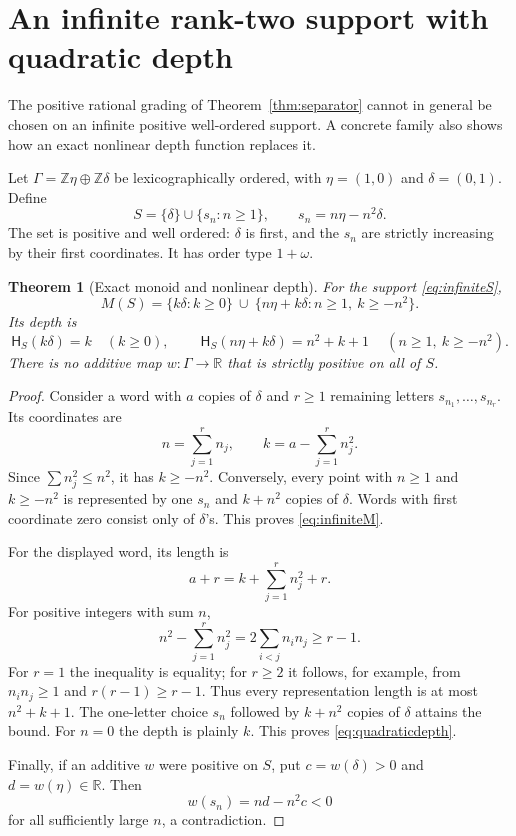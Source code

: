 \documentclass[11pt,a4paper]{article}
\newtheorem{theorem}{Theorem}[section]
\theoremstyle{definition}
\theoremstyle{remark}
\newcommand{\Z}{\mathbb Z}
\newcommand{\R}{\mathbb R}
\newcommand{\depth}{\mathsf H}
\begin{document}
\section{An infinite rank-two support with quadratic depth}
\label{sec:infinite}

The positive rational grading of Theorem~\ref{thm:separator} cannot in
general be chosen on an infinite positive well-ordered support. A concrete
family also shows how an exact nonlinear depth function replaces it.

Let $\Gamma=\Z\eta\oplus\Z\delta$ be lexicographically ordered, with
$\eta=(1,0)$ and $\delta=(0,1)$. Define
\begin{equation}\label{eq:infiniteS}
 S=\{\delta\}\cup\{s_n:n\ge1\},\qquad
 s_n=n\eta-n^2\delta.
\end{equation}
The set is positive and well ordered: $\delta$ is first, and the $s_n$ are
strictly increasing by their first coordinates. It has order type
$1+\omega$.

\begin{theorem}[Exact monoid and nonlinear depth]\label{thm:quadraticdepth}
For the support \eqref{eq:infiniteS},
\begin{equation}\label{eq:infiniteM}
 M(S)=\{k\delta:k\ge0\}
 \ \cup\ \{n\eta+k\delta:n\ge1,\ k\ge-n^2\}.
\end{equation}
Its depth is
\begin{equation}\label{eq:quadraticdepth}
 \depth_S(k\delta)=k\quad(k\ge0),\qquad
 \boxed{\ \depth_S(n\eta+k\delta)=n^2+k+1\ }
 \quad(n\ge1,\ k\ge-n^2).
\end{equation}
There is no additive map $w:\Gamma\to\R$ that is strictly positive on
all of $S$.
\end{theorem}
\begin{proof}
Consider a word with $a$ copies of $\delta$ and $r\ge1$ remaining letters
$s_{n_1},\ldots,s_{n_r}$. Its coordinates are
\[
 n=\sum_{j=1}^r n_j,\qquad
 k=a-\sum_{j=1}^r n_j^2.
\]
Since $\sum n_j^2\le n^2$, it has $k\ge-n^2$. Conversely, every point
with $n\ge1$ and $k\ge-n^2$ is represented by one $s_n$ and $k+n^2$
copies of $\delta$. Words with first coordinate zero consist only of
$\delta$'s. This proves \eqref{eq:infiniteM}.

For the displayed word, its length is
\[
 a+r=k+\sum_{j=1}^r n_j^2+r.
\]
For positive integers with sum $n$,
\[
 n^2-\sum_{j=1}^r n_j^2
 =2\sum_{i<j}n_in_j\ge r-1.
\]
For $r=1$ the inequality is equality; for $r\ge2$ it follows, for example,
from $n_in_j\ge1$ and $r(r-1)\ge r-1$.
Thus every representation length is at most $n^2+k+1$. The one-letter
choice $s_n$ followed by $k+n^2$ copies of $\delta$ attains the bound.
For $n=0$ the depth is plainly $k$. This proves \eqref{eq:quadraticdepth}.

Finally, if an additive $w$ were positive on $S$, put
$c=w(\delta)>0$ and $d=w(\eta)\in\R$. Then
\[
 w(s_n)=nd-n^2c<0
\]
for all sufficiently large $n$, a contradiction.
\end{proof}
\end{document}
